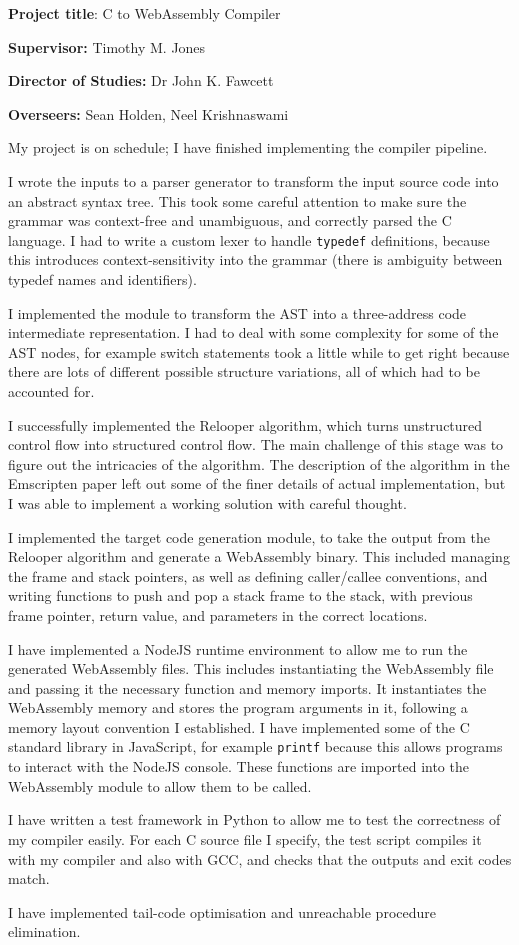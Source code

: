 \documentclass[12pt, a4paper]{article}
\begin{document}
\textbf{Project title}: C to WebAssembly Compiler

\textbf{Supervisor:} Timothy M. Jones

\textbf{Director of Studies:} Dr John K. Fawcett

\textbf{Overseers:} Sean Holden, Neel Krishnaswami

\vspace{3\parskip}

My project is on schedule; I have finished implementing the compiler pipeline.

I wrote the inputs to a parser generator to transform the input source code into an abstract syntax tree.
This took some careful attention to make sure the grammar was context-free and unambiguous, and correctly parsed the C language.
I had to write a custom lexer to handle \texttt{typedef} definitions, because this introduces context-sensitivity into the grammar (there is ambiguity between typedef names and identifiers).

I implemented the module to transform the AST into a three-address code intermediate representation.
I had to deal with some complexity for some of the AST nodes, for example switch statements took a little while to get right because there are lots of different possible structure variations, all of which had to be accounted for.

I successfully implemented the Relooper algorithm, which turns unstructured control flow into structured control flow.
The main challenge of this stage was to figure out the intricacies of the algorithm. The description of the algorithm in the Emscripten paper left out some of the finer details of actual implementation, but I was able to implement a working solution with careful thought.

I implemented the target code generation module, to take the output from the Relooper algorithm and generate a WebAssembly binary.
This included managing the frame and stack pointers, as well as defining caller/callee conventions, and writing functions to push and pop a stack frame to the stack, with previous frame pointer, return value, and parameters in the correct locations.

I have implemented a NodeJS runtime environment to allow me to run the generated WebAssembly files.
This includes instantiating the WebAssembly file and passing it the necessary function and memory imports.
It instantiates the WebAssembly memory and stores the program arguments in it, following a memory layout convention I established.
I have implemented some of the C standard library in JavaScript, for example \texttt{printf} because this allows programs to interact with the NodeJS console. These functions are imported into the WebAssembly module to allow them to be called.

I have written a test framework in Python to allow me to test the correctness of my compiler easily.
For each C source file I specify, the test script compiles it with my compiler and also with GCC, and checks that the outputs and exit codes match.

I have implemented tail-code optimisation and unreachable procedure elimination.
\end{document}
